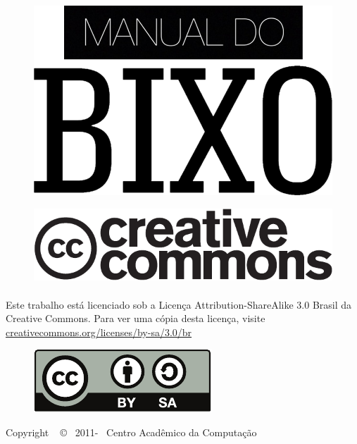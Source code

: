 \documentclass[a4paper,10pt,openany]{book}
\begin{document}
\frontmatter
\begin{figure}[H]
    \vskip 50pt %
    \centering
    \includegraphics[width=.85\textwidth]{img/manual_logo.png}
\end{figure}

\vfill %

\begin{figure}[H]
    \centering
    \includegraphics[width=.5\textwidth]{img/cc_logo.pdf}
\end{figure}

\paragraph{}
Este trabalho está licenciado sob a Licença Attribution-ShareAlike 3.0 Brasil da
Creative Commons. Para ver uma cópia desta licença, visite
\url{creativecommons.org/licenses/by-sa/3.0/br}

\begin{figure}[H]
    \centering
    \includegraphics[width=.25\textwidth]{img/by-sa.pdf}
\end{figure}

\begin{center}
    Copyright ~ \copyright ~ 2011-\the\year ~ Centro Acadêmico da Computação
\end{center}

\clearpage
\end{document}

